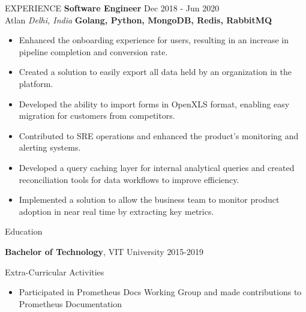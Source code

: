 \documentclass{resume} %
\begin{document}
\begin{rSection}{EXPERIENCE}
\textbf{Software Engineer} \hfill Dec 2018 - Jun 2020\\
Atlan \hfill \textit{Delhi, India} \newline
\textbf{Golang, Python, MongoDB, Redis, RabbitMQ}
 \begin{itemize}
    \itemsep -3pt {} 
\item Enhanced the onboarding experience for users, resulting in an increase in pipeline completion and conversion rate.
\item Created a solution to easily export all data held by an organization in the platform.
\item Developed the ability to import forms in OpenXLS format, enabling easy migration for customers from competitors.
\item Contributed to SRE operations and enhanced the product's monitoring and alerting systems.
\item Developed a query caching layer for internal analytical queries and created reconciliation tools for data workflows to improve efficiency.
\item Implemented a solution to allow the business team to monitor product adoption in near real time by extracting key metrics.
 \end{itemize}
\end{rSection} 


\begin{rSection}{Education}

{\bf Bachelor of Technology}, VIT University \hfill {2015-2019}\\
\end{rSection}


\begin{rSection}{Extra-Curricular Activities} 
\begin{itemize}
    \item 	Participated in Prometheus Docs Working Group and made contributions to Prometheus Documentation
\end{itemize}
\end{rSection}
\end{document}
